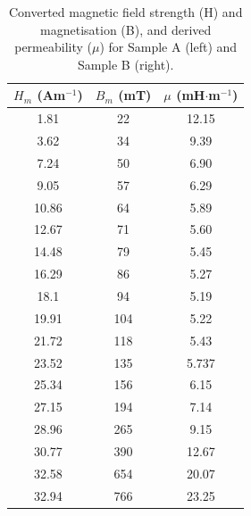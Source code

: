 \documentclass{article}
\begin{document}
\begin{table}[h]
\begin{minipage}{0.48\textwidth}
		\begin{tabular}{ccc}
			\toprule
			$H_m$ (Am$^{-1}$) & $B_m$ (mT) & $\mu$ (mH$\cdot$m$^{-1}$) \\
			\midrule
			1.81              & 22         & 12.15                     \\
			3.62              & 34         & 9.39                      \\
			7.24              & 50         & 6.90                      \\
			9.05              & 57         & 6.29                      \\
			10.86             & 64         & 5.89                      \\
			12.67             & 71         & 5.60                      \\
			14.48             & 79         & 5.45                      \\
			16.29             & 86         & 5.27                      \\
			18.1              & 94         & 5.19                      \\
			19.91             & 104        & 5.22                      \\
			21.72             & 118        & 5.43                      \\
			23.52             & 135        & 5.737                     \\
			25.34             & 156        & 6.15                      \\
			27.15             & 194        & 7.14                      \\
			28.96             & 265        & 9.15                      \\
			30.77             & 390        & 12.67                     \\
			32.58             & 654        & 20.07                     \\
			32.94             & 766        & 23.25                     \\
			\bottomrule
		\end{tabular}
	\end{minipage}
	\caption{Converted magnetic field strength (H) and magnetisation (B), and derived permeability ($\mu$)
		for Sample A (left) and Sample B (right).}
	\label{4}
\end{table}
\end{document}
